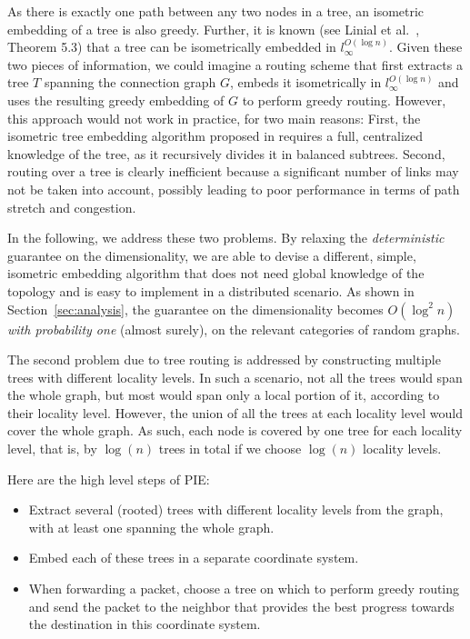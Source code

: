 \documentclass[conference]{IEEEtran}
\begin{document}
As there is exactly one path between any two nodes in a tree, an isometric embedding of a tree is also greedy.
Further, it is known (see Linial et al.\ \cite{linial}, Theorem 5.3) that a tree can be isometrically embedded in $l_{\infty}^{O(\log n)}$. Given these two pieces of information, we could imagine a routing scheme that first extracts a tree $T$ spanning the connection graph $G$, embeds it isometrically in $l_{\infty}^{O(\log n)}$ and uses the resulting greedy embedding of $G$ to perform greedy routing. However, this approach would not work in practice, for two main reasons: 
First, the isometric tree embedding algorithm proposed in \cite{linial} requires a full, centralized knowledge of the tree, as it recursively divides it in balanced subtrees. Second, routing over a tree is clearly inefficient because a significant number of links may not be taken into account, possibly leading to poor performance in terms of path stretch and congestion.

In the following, we address these two problems. 
By relaxing the \emph{deterministic} guarantee on the dimensionality, we are able to devise a different, simple, isometric embedding algorithm that does not need global knowledge of the topology and is easy to implement in a distributed scenario. As shown in Section~\ref{sec:analysis}, the guarantee on the dimensionality becomes $O(\log^2n)$ \emph{with probability one} (almost surely), on the relevant categories of random graphs.

The second problem due to tree routing is addressed by constructing multiple trees with different locality levels. In such a scenario, not all the trees would span the whole graph, but most would span only a local portion of it, according to their locality level. However, the union of all the trees at each locality level would cover the whole graph. As such, each node is covered by one tree for each locality level, that is, by $\log(n)$ trees in total if we choose $\log(n)$ locality levels.

Here are the high level steps of PIE:

\begin{itemize}
 \item Extract several (rooted) trees with different locality levels from the graph, with at least one spanning the whole graph.
 \item Embed each of these trees in a separate coordinate system.
 \item When forwarding a packet, choose a tree on which to perform greedy routing and send the packet to the neighbor that provides the best progress towards the destination in this coordinate system.
\end{itemize}
\end{document}
